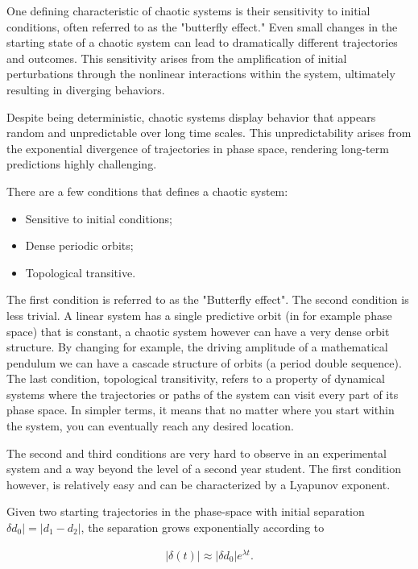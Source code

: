 \documentclass{article}
\begin{document}
One defining characteristic of chaotic systems is their sensitivity to initial conditions, often referred to as the "butterfly effect." Even small changes in the starting state of a chaotic system can lead to dramatically different trajectories and outcomes. This sensitivity arises from the amplification of initial perturbations through the nonlinear interactions within the system, ultimately resulting in diverging behaviors.

Despite being deterministic, chaotic systems display behavior that appears random and unpredictable over long time scales. This unpredictability arises from the exponential divergence of trajectories in phase space, rendering long-term predictions highly challenging.

There are a few conditions that defines a chaotic system:
\begin{itemize}
    \item Sensitive to initial conditions;
    \item Dense periodic orbits;
    \item Topological transitive.
\end{itemize}
The first condition is referred to as the "Butterfly effect". The second condition is less trivial. A linear system has a single predictive orbit (in for example phase space) that is constant, a chaotic system however can have a very dense orbit structure. By changing for example, the driving amplitude of a mathematical pendulum we can have a cascade structure of orbits (a period double sequence). The last condition, topological transitivity, refers to a property of dynamical systems where the trajectories or paths of the system can visit every part of its phase space. In simpler terms, it means that no matter where you start within the system, you can eventually reach any desired location.

The second and third conditions are very hard to observe in an experimental system and a way beyond the level of a second year student. The first condition however, is relatively easy and can be characterized by a Lyapunov exponent.

Given two starting trajectories in the phase-space with initial separation $\delta d_0| = |d_1-d_2|$, the separation grows exponentially according to

\begin{align}
    |\delta(t)|\approx |\delta d_0|e^{\lambda t}.
    \label{Eq. Lyapunov}
\end{align}
\end{document}
